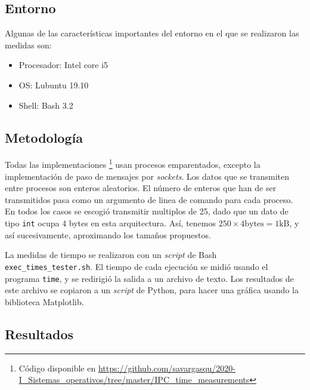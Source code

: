 \subsection{Entorno}

Algunas de las características importantes del entorno en el que se realizaron las medidas son:
\begin{itemize}\tightlist
  \item Procesador: Intel core i5
  \item OS: Lubuntu 19.10
  \item Shell: Bash 3.2
\end{itemize}

\subsection{Metodología}

Todas las implementaciones
\footnote{Código disponible en
\url{https://github.com/savargasqu/2020-I_Sistemas_operativos/tree/master/IPC_time_measurements}}
usan procesos emparentados,
excepto la implementación de paso de mensajes por \emph{sockets}.
Los datos que se transmiten entre procesos son enteros aleatorios.
El número de enteros que han de ser transmitidos pasa como un argumento de linea de comando para cada proceso.
En todos los casos se escogió transmitir multiplos de 25,
dado que un dato de tipo \texttt{int} ocupa 4 bytes en esta arquitectura.
Así, tenemos $250 \times 4 \text{bytes} = 1 \text{kB}$, y así sucesivamente,
aproximando los tamaños propuestos.

La medidas de tiempo se realizaron con un \emph{script} de Bash \texttt{exec\_times\_tester.sh}.
El tiempo de cada ejecución se midió usando el programa \texttt{time},
y se redirigió la salida a un archivo de texto.
Los resultados de este archivo se copiaron a un \emph{script} de Python,
para hacer una gráfica usando la biblioteca Matplotlib.

\hypertarget{resultados}{%
\subsection{Resultados}\label{resultados}}

